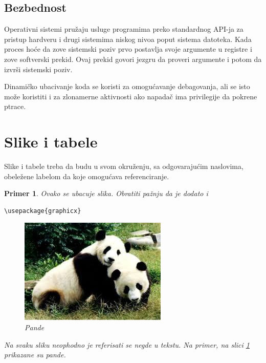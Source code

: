 \documentclass[a4paper]{article}
\newtheorem{primer}{Primer}[section]
\begin{document}
\subsection{Bezbednost}	

Operativni sistemi pružaju usluge programima preko standardnog API-ja za pristup
hardveru i drugi sistemima niskog nivoa poput sistema datoteka. 
Kada proces hoće da zove sistemski poziv prvo postavlja svoje argumente u registre i 
zove softverski prekid. Ovaj prekid govori jezgru da proveri argumente i potom da
izvrši sistemski poziv.

Dinamičko ubacivanje koda se koristi za omogućavanje debagovanja, ali se isto može koristiti
i za zlonamerne aktivnosti ako napadač ima privilegije da pokrene ptrace.

\section{Slike i tabele}

\label{slike_i_tabele}

Slike i tabele treba da budu u svom okruženju, sa odgovarajućim naslovima, obeležene labelom da koje omogućava referenciranje. 

\begin{primer} Ovako se ubacuje slika. Obratiti pažnju da je dodato i 
\begin{verbatim}
\usepackage{graphicx}
\end{verbatim}

\begin{figure}[h!]
\begin{center}
\includegraphics[scale=0.75]{img/pande.jpg}
\end{center}
\caption{Pande}
\label{fig:pande}
\end{figure}

Na svaku sliku neophodno je referisati se negde u tekstu. Na primer, na slici \ref{fig:pande} prikazane su pande. 
\end{primer}
\end{document}
